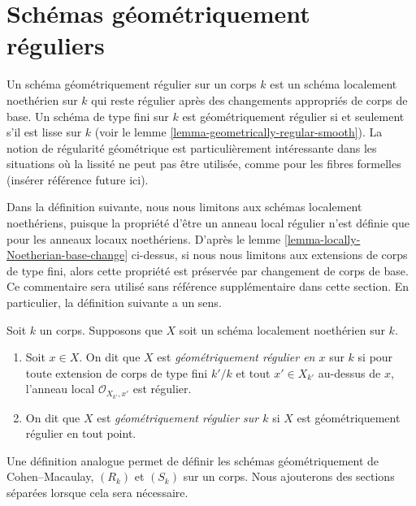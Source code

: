 \section{Schémas géométriquement réguliers}
\label{section-geometrically-regular}

\noindent
Un schéma géométriquement régulier sur un corps $k$ est un schéma
localement noethérien sur $k$ qui reste régulier après des changements
appropriés de corps de base. Un schéma de type fini sur $k$ est
géométriquement régulier si et seulement s'il est lisse sur $k$ (voir le lemme
\ref{lemma-geometrically-regular-smooth}). La notion de régularité géométrique
est particulièrement intéressante dans les situations où la lissité ne peut pas
être utilisée, comme pour les fibres formelles (insérer référence future ici).

\medskip\noindent
Dans la définition suivante, nous nous limitons aux schémas
localement noethériens, puisque la propriété d'être un anneau
local régulier n'est définie que pour les anneaux locaux
noethériens. D'après le lemme
\ref{lemma-locally-Noetherian-base-change} ci-dessus, si nous nous limitons
aux extensions de corps de type fini, alors cette propriété est préservée par
changement de corps de base. Ce commentaire sera utilisé sans référence
supplémentaire dans cette section. En particulier, la définition suivante a un sens.

\begin{definition}
\label{definition-geometrically-regular}
Soit $k$ un corps. Supposons que $X$ soit un schéma localement noethérien sur $k$.
\begin{enumerate}
\item Soit $x \in X$. On dit que $X$ est {\it
géométriquement régulier en $x$} sur $k$ si pour toute
extension de corps de type fini $k'/k$ et tout $x' \in X_{k'}$
au-dessus de $x$, l'anneau local $\mathcal{O}_{X_{k'}, x'}$ est
régulier. \item On dit que $X$ est {\it géométriquement régulier
sur $k$} si $X$ est géométriquement régulier en tout point.
\end{enumerate}
\end{definition}

\noindent
Une définition analogue permet de définir les schémas géométriquement
de Cohen--Macaulay, $(R_k)$ et $(S_k)$ sur un corps. Nous ajouterons
des sections séparées lorsque cela sera nécessaire.

